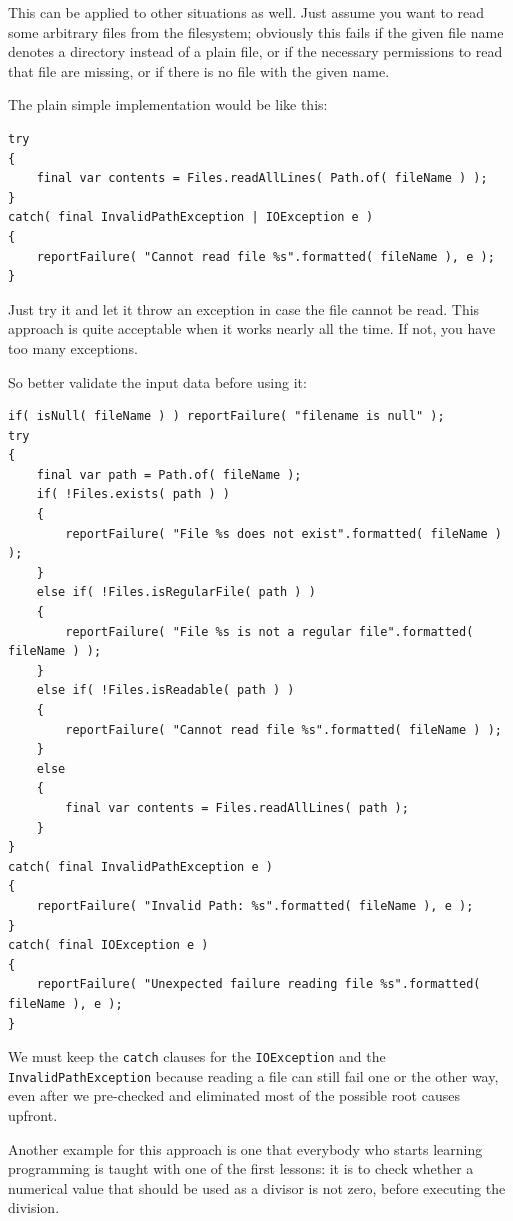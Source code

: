 This can be applied to other situations as well. Just assume you want to read some arbitrary files from the filesystem; obviously this fails if the given file name denotes a directory instead of a plain file, or if the necessary permissions to read that file are missing, or if there is no file with the given name. 

The plain simple implementation would be like this:
\begin{lstlisting}
try
{
    final var contents = Files.readAllLines( Path.of( fileName ) );
}
catch( final InvalidPathException | IOException e )
{
    reportFailure( "Cannot read file %s".formatted( fileName ), e );
}
\end{lstlisting}

Just try it and let it throw an exception in case the file cannot be read. This approach is quite acceptable when it works nearly all the time. If not, you have too many exceptions.

So better validate the input data before using it:
\begin{lstlisting}
if( isNull( fileName ) ) reportFailure( "filename is null" );
try
{
    final var path = Path.of( fileName );
    if( !Files.exists( path ) )
    {
        reportFailure( "File %s does not exist".formatted( fileName ) );
    }
    else if( !Files.isRegularFile( path ) )
    {
        reportFailure( "File %s is not a regular file".formatted( fileName ) );
    }
    else if( !Files.isReadable( path ) )
    {
        reportFailure( "Cannot read file %s".formatted( fileName ) );
    }
    else
    {
        final var contents = Files.readAllLines( path );
    }
}
catch( final InvalidPathException e )
{
    reportFailure( "Invalid Path: %s".formatted( fileName ), e );
}
catch( final IOException e )
{
    reportFailure( "Unexpected failure reading file %s".formatted( fileName ), e );
}
\end{lstlisting}

We must keep the \lstinline|catch| clauses for the \lstinline|IOException| and the \lstinline|InvalidPathException| because reading a file can still fail one or the other way, even after we pre-checked and eliminated most of the possible root causes upfront.

Another example for this approach is one that everybody who starts learning programming is taught with one of the first lessons: it is to check whether a numerical value that should be used as a divisor is not zero, before executing the division.


